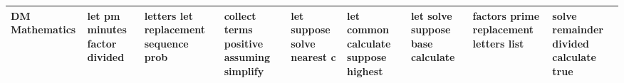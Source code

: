 \documentclass[11pt,a4paper]{article}
\begin{document}
\begin{appendices}
\begin{table*}[htp]
\begin{tiny}
\begin{tabular}{|p{}|p{}|p{}|p{}|p{}|p{}|p{}|p{}|p{}|}
DM Mathematics & let \newline pm \newline minutes \newline factor \newline divided & letters \newline let \newline replacement \newline sequence \newline prob & collect \newline terms \newline positive \newline assuming \newline simplify & let \newline suppose \newline solve \newline nearest \newline c & let \newline common \newline calculate \newline suppose \newline highest & let \newline solve \newline suppose \newline base \newline calculate & factors \newline prime \newline replacement \newline letters \newline list & solve \newline remainder \newline divided \newline calculate \newline true\\\hline

\end{tabular}
\end{tiny}
\end{table*}
\end{appendices}
\end{document}
